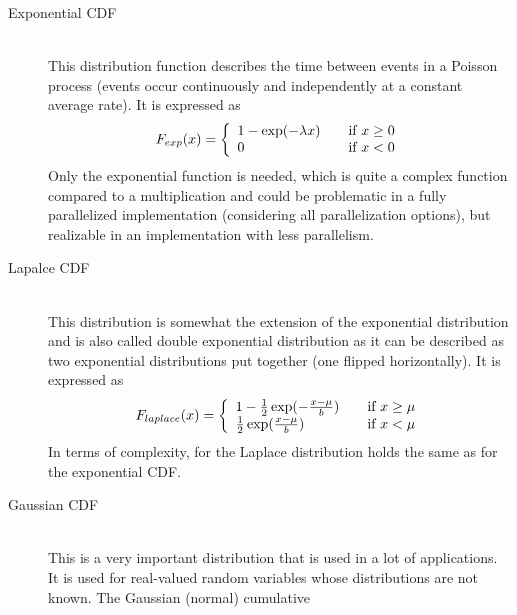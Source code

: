 \documentclass[mscthesis]{usiinfthesis}
\begin{document}
\begin{description}
    \item[Exponential CDF] \hfill \\
        This distribution function describes the time between
        events in a Poisson process (events occur continuously and independently
        at a constant average rate). It is expressed as
        \begin{equation}
            \label{eq:V}
            F_{exp}(x) = \left\{
                \begin{array}{l l}
                    1 - \exp(-\lambda x)
                        & \quad \text{if $x \geq 0$}\\
                    0
                        & \quad \text{if $x < 0$}
                \end{array} \right.
        \end{equation}
        Only the exponential function is needed, which is quite a complex
        function compared to a multiplication and could be problematic in a
        fully parallelized implementation (considering all parallelization
        options), but realizable in an implementation with less parallelism.
    \item[Lapalce CDF] \hfill \\
        This distribution is somewhat the extension of the
        exponential distribution and is also called double exponential
        distribution as it can be described as two exponential distributions
        put together (one flipped horizontally). It is expressed as
        \begin{equation}
            \label{eq:V}
            F_{laplace}(x) = \left\{
                \begin{array}{l l}
                    1 - \frac{1}{2}\exp(-\frac{x-\mu}{b})
                        & \quad \text{if $x \geq \mu$}\\
                    \frac{1}{2} \exp(\frac{x-\mu}{b})
                        & \quad \text{if $x < \mu$}
                \end{array} \right.
        \end{equation}
        In terms of complexity, for the Laplace distribution holds the same as
        for the exponential CDF.
    \item[Gaussian CDF] \hfill \\
        This is a very important distribution that is used in a lot of
        applications. It is used for real-valued random variables whose
        distributions are not known. The Gaussian (normal) cumulative

\end{description}
\end{document}

